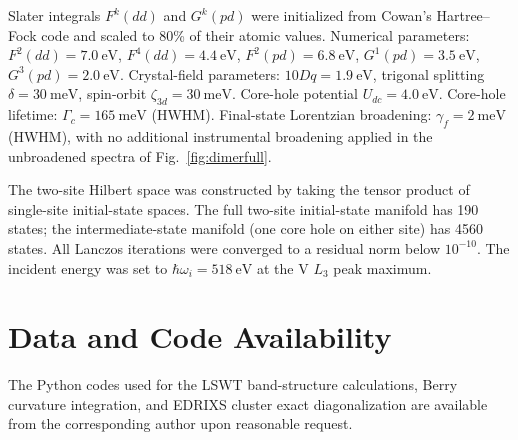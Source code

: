 \documentclass[aps,prb,twocolumn,superscriptaddress,longbibliography]{revtex4-2}
\begin{document}
Slater integrals $F^k(dd)$ and $G^k(pd)$ were initialized from Cowan's
Hartree--Fock code and scaled to 80\% of their atomic values.
Numerical parameters: $F^2(dd) = \SI{7.0}{\eV}$, $F^4(dd) = \SI{4.4}{\eV}$,
$F^2(pd) = \SI{6.8}{\eV}$, $G^1(pd) = \SI{3.5}{\eV}$, $G^3(pd) = \SI{2.0}{\eV}$.
Crystal-field parameters: $10Dq = \SI{1.9}{\eV}$, trigonal splitting
$\delta = \SI{30}{\milli\eV}$, spin-orbit $\zeta_{3d} = \SI{30}{\milli\eV}$.
Core-hole potential $U_{dc} = \SI{4.0}{\eV}$.
Core-hole lifetime: $\Gamma_c = \SI{165}{\milli\eV}$ (HWHM).
Final-state Lorentzian broadening: $\gamma_f = \SI{2}{\milli\eV}$ (HWHM),
with no additional instrumental broadening applied in the unbroadened spectra
of Fig.~\ref{fig:dimerfull}.

The two-site Hilbert space was constructed by taking the tensor product of
single-site initial-state spaces.
The full two-site initial-state manifold has 190 states; the intermediate-state
manifold (one core hole on either site) has 4560 states.
All Lanczos iterations were converged to a residual norm below $10^{-10}$.
The incident energy was set to $\hbar\omega_i = \SI{518}{\eV}$ at the
V $L_3$ peak maximum.

\section*{Data and Code Availability}
The Python codes used for the LSWT band-structure calculations, Berry
curvature integration, and EDRIXS cluster exact diagonalization are
available from the corresponding author upon reasonable request.
\end{document}
